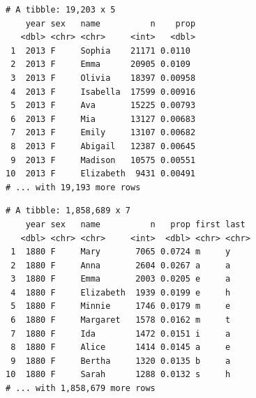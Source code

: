 \documentclass[]{book}
\newenvironment{Shaded}{\begin{snugshade}}{\end{snugshade}}
\newcommand{\DataTypeTok}[1]{\textcolor[rgb]{0.13,0.29,0.53}{#1}}
\newcommand{\DecValTok}[1]{\textcolor[rgb]{0.00,0.00,0.81}{#1}}
\newcommand{\KeywordTok}[1]{\textcolor[rgb]{0.13,0.29,0.53}{\textbf{#1}}}
\newcommand{\NormalTok}[1]{#1}
\newcommand{\OperatorTok}[1]{\textcolor[rgb]{0.81,0.36,0.00}{\textbf{#1}}}
\newcommand{\StringTok}[1]{\textcolor[rgb]{0.31,0.60,0.02}{#1}}
\theoremstyle{definition}
\theoremstyle{definition}
\theoremstyle{definition}
\theoremstyle{remark}
\begin{document}
\begin{Shaded}
\end{Shaded}

\begin{verbatim}
# A tibble: 19,203 x 5
    year sex   name          n    prop
   <dbl> <chr> <chr>     <int>   <dbl>
 1  2013 F     Sophia    21171 0.0110 
 2  2013 F     Emma      20905 0.0109 
 3  2013 F     Olivia    18397 0.00958
 4  2013 F     Isabella  17599 0.00916
 5  2013 F     Ava       15225 0.00793
 6  2013 F     Mia       13127 0.00683
 7  2013 F     Emily     13107 0.00682
 8  2013 F     Abigail   12387 0.00645
 9  2013 F     Madison   10575 0.00551
10  2013 F     Elizabeth  9431 0.00491
# ... with 19,193 more rows
\end{verbatim}

\begin{Shaded}
\end{Shaded}

\begin{verbatim}
# A tibble: 1,858,689 x 7
    year sex   name          n   prop first last 
   <dbl> <chr> <chr>     <int>  <dbl> <chr> <chr>
 1  1880 F     Mary       7065 0.0724 m     y    
 2  1880 F     Anna       2604 0.0267 a     a    
 3  1880 F     Emma       2003 0.0205 e     a    
 4  1880 F     Elizabeth  1939 0.0199 e     h    
 5  1880 F     Minnie     1746 0.0179 m     e    
 6  1880 F     Margaret   1578 0.0162 m     t    
 7  1880 F     Ida        1472 0.0151 i     a    
 8  1880 F     Alice      1414 0.0145 a     e    
 9  1880 F     Bertha     1320 0.0135 b     a    
10  1880 F     Sarah      1288 0.0132 s     h    
# ... with 1,858,679 more rows
\end{verbatim}
\end{document}
